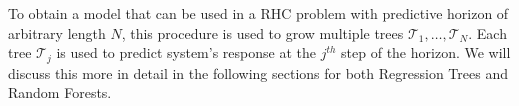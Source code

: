 \documentclass[]{ifacconf}  %
\begin{document}
To obtain a model that can be used in a RHC problem with predictive horizon of arbitrary length $N$, this procedure is used to grow multiple trees $\mathcal{T}_1,\ldots,\mathcal{T}_N$.
Each tree $\mathcal{T}_j$ is used to predict system's response at the $j^{th}$ step of the horizon.
We will discuss this more in detail in the following sections for both Regression Trees and Random Forests.
%
\end{document}

